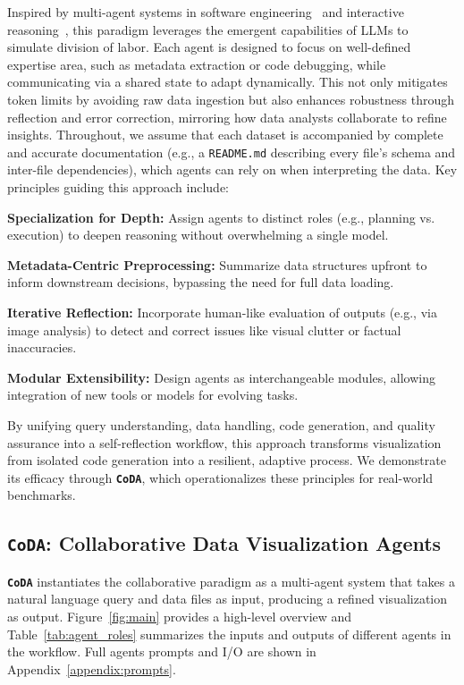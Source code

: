 \documentclass[11pt, a4paper, logo, copyright]{googlecloud}
\newcommand{\methodname}{\textbf{\texttt{\textcolor{StarIndigo}{C}\textcolor{StarIndigo}{o}\textcolor{StarCoral}{D}\textcolor{StarTeal}{A}}}}
\newcommand{\io}[1]{\setlength{\fboxsep}{1pt}\colorbox{gray!10}{\texttt{#1}}}
\begin{document}
Inspired by multi-agent systems in software engineering~\citep{Yang2024SWEagentAI} and interactive reasoning~\citep{Yao2022ReActSR}, this paradigm leverages the emergent capabilities of LLMs to simulate division of labor. Each agent is designed to focus on well-defined expertise area, such as metadata extraction or code debugging, while communicating via a shared state to adapt dynamically. This not only mitigates token limits by avoiding raw data ingestion but also enhances robustness through reflection and error correction, mirroring how data analysts collaborate to refine insights. Throughout, we assume that each dataset is accompanied by complete and accurate documentation (e.g., a \io{README.md} describing every file's schema and inter-file dependencies), which agents can rely on when interpreting the data.
Key principles guiding this approach include:

\textbf{\textcolor{StarIndigo}{Specialization for Depth:}} Assign agents to distinct roles (e.g., planning vs. execution) to deepen reasoning without overwhelming a single model.

\textbf{\textcolor{StarIndigo}{Metadata-Centric Preprocessing:}} Summarize data structures upfront to inform downstream decisions, bypassing the need for full data loading.

\textbf{\textcolor{StarIndigo}{Iterative Reflection:}} Incorporate human-like evaluation of outputs (e.g., via image analysis) to detect and correct issues like visual clutter or factual inaccuracies.

\textbf{\textcolor{StarIndigo}{Modular Extensibility:}} Design agents as interchangeable modules, allowing integration of new tools or models for evolving tasks.


By unifying query understanding, data handling, code generation, and quality assurance into a self-reflection workflow, this approach transforms visualization from isolated code generation into a resilient, adaptive process. We demonstrate its efficacy through \methodname{}, which operationalizes these principles for real-world benchmarks.

\subsection{\methodname{}: Collaborative Data Visualization Agents}

\methodname{} instantiates the collaborative paradigm as a multi-agent system that takes a natural language query and data files as input, producing a refined visualization as output. Figure~\ref{fig:main} provides a high-level overview and Table~\ref{tab:agent_roles} summarizes the inputs and outputs of different agents in the workflow. 
Full agents prompts and I/O are shown in Appendix~\ref{appendix:prompts}.
\end{document}
